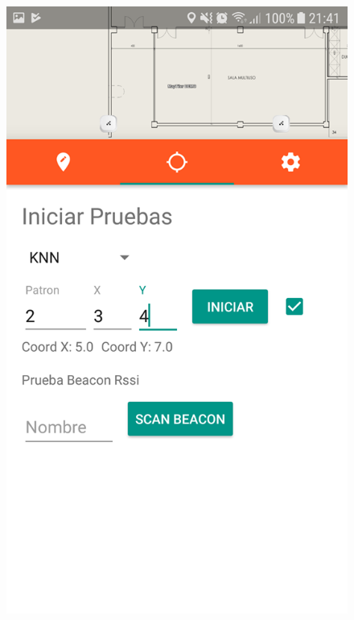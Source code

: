 \documentclass[handout]{beamer}
\begin{document}
\begin{frame}
\begin{columns}[t]
\begin{figure}
\includegraphics[width=\textwidth]{../figures/fase_online2.png}
\end{figure}


\end{columns}
\end{frame}
\end{document}

